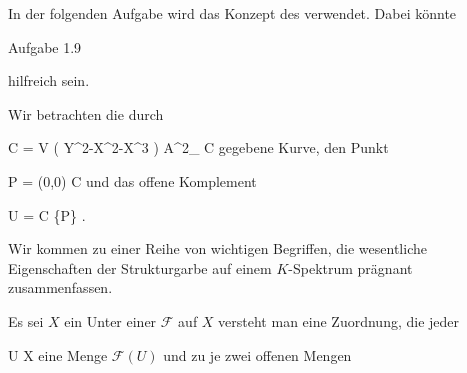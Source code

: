 In der folgenden Aufgabe wird das Konzept des
verwendet. Dabei könnte

Aufgabe 1.9

hilfreich sein.

{}
{





Wir betrachten die durch

\mavergleichskettedisp
{\vergleichskette
{ C
}
{ =} { V \left(  Y^2-X^2-X^3  \right)
}
{ \subseteq} { {\mathbb A}^{2}_{ {\mathbb C} }
}
{ } {
}
{ } {
}
}
{}{}{}
gegebene Kurve, den Punkt

\mavergleichskette
{\vergleichskette
{ P
}
{ = }{ (0,0)
}
{ \in }{ C
}
{    }{
}
{   }{
}
}
{}{}{}
und das offene Komplement

\mavergleichskette
{\vergleichskette
{ U
}
{ = }{ C \setminus \{P\}
}
{  }{
}
{    }{
}
{   }{
}
}
{}{}{.}





}
{} {}

Wir kommen zu einer Reihe von
 {} {}
wichtigen Begriffen, die wesentliche Eigenschaften der Strukturgarbe auf einem $K$-Spektrum prägnant zusammenfassen.







Es sei $X$ ein
Unter einer
${ \mathcal F  }$ auf $X$ versteht man eine Zuordnung, die jeder

\mavergleichskette
{\vergleichskette
{U
}
{ \subseteq }{ X
}
{  }{
}
{    }{
}
{   }{
}
}
{}{}{}
eine Menge ${ \mathcal  F   }  \left(   U   \right)$ und zu je zwei offenen Mengen


